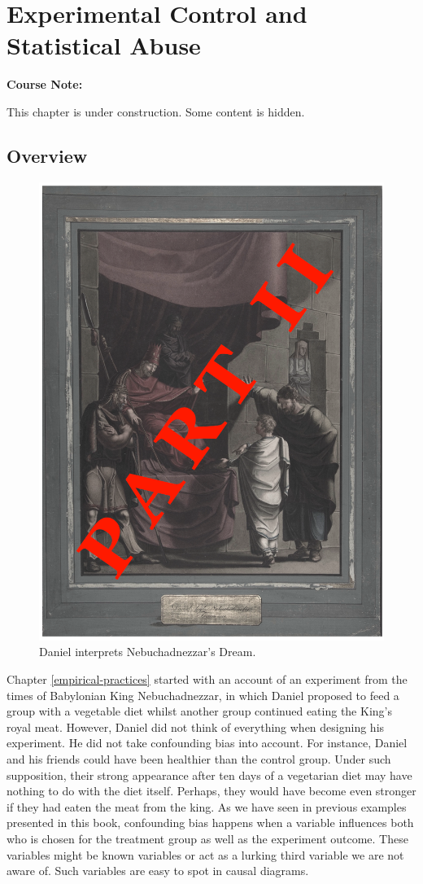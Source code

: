 \documentclass[
]{book}
\begin{document}
\hypertarget{stats-abuse}{%
\chapter{Experimental Control and Statistical Abuse}\label{stats-abuse}}


\begin{notebox}

\begin{center}
\textbf{Course Note:}

\end{center}

This chapter is under construction. Some content is hidden.

\end{notebox}

\hypertarget{stats-overview}{%
\section{Overview}\label{stats-overview}}

\begin{figure}

{\centering \includegraphics[width=0.33\linewidth]{Figures/daniel_part_2} 

}

\caption{Daniel interprets Nebuchadnezzar's Dream.}\label{fig:daniel-part-two}
\end{figure}

Chapter \ref{empirical-practices} started with an account of an experiment from the times of Babylonian King Nebuchadnezzar, in which Daniel proposed to feed a group with a vegetable diet whilst another group continued eating the King's royal meat. However, Daniel did not think of everything when designing his experiment. He did not take confounding bias into account. For instance, Daniel and his friends could have been healthier than the control group. Under such supposition, their strong appearance after ten days of a vegetarian diet may have nothing to do with the diet itself. Perhaps, they would have become even stronger if they had eaten the meat from the king. As we have seen in previous examples presented in this book, confounding bias happens when a variable influences both who is chosen for the treatment group as well as the experiment outcome. These variables might be known variables or act as a lurking third variable we are not aware of. Such variables are easy to spot in causal diagrams.
\end{document}
